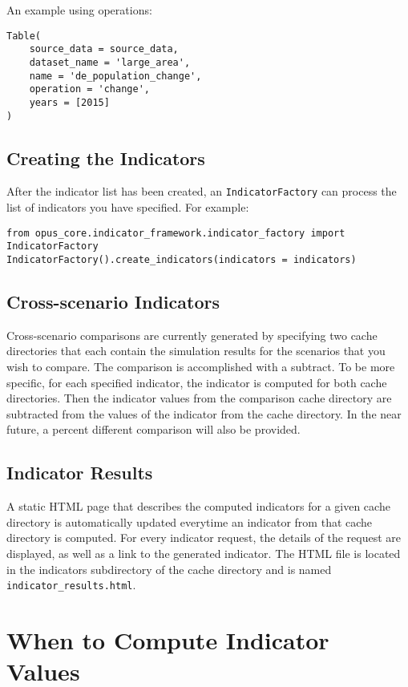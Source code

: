 An example using operations:
\begin{verbatim}
Table(
    source_data = source_data,
    dataset_name = 'large_area',
    name = 'de_population_change',
    operation = 'change',
	years = [2015]
)
\end{verbatim}

\subsection{Creating the Indicators}
After the indicator list has been created, an
\verb|IndicatorFactory| can process the list of indicators you have specified. 
For example:

\begin{verbatim}
from opus_core.indicator_framework.indicator_factory import IndicatorFactory
IndicatorFactory().create_indicators(indicators = indicators)
\end{verbatim}

\subsection{Cross-scenario Indicators}
\label{sec:indicator-cross-scenario}

Cross-scenario comparisons are currently generated by specifying two 
cache directories that each contain the simulation results for the 
scenarios that you wish to compare. The comparison is 
accomplished with a subtract. To be more specific, for each specified 
indicator, the indicator is computed for both cache directories. Then
the indicator values from the comparison cache directory are subtracted
from the values of the indicator from the cache directory. 
In the near future, a percent different comparison will also be provided.

\subsection{Indicator Results}
\label{sec:indicator-results}

A static HTML page that describes the computed indicators for a given
cache directory is automatically updated everytime an indicator from 
that cache directory is computed. For every indicator request, the 
details of the request are displayed, as well as a link to the generated 
indicator. The HTML file is located in the indicators subdirectory of the 
cache directory and is named \verb|indicator_results.html|.

\section{When to Compute Indicator Values}
\indicatorsindex\attributesindex

